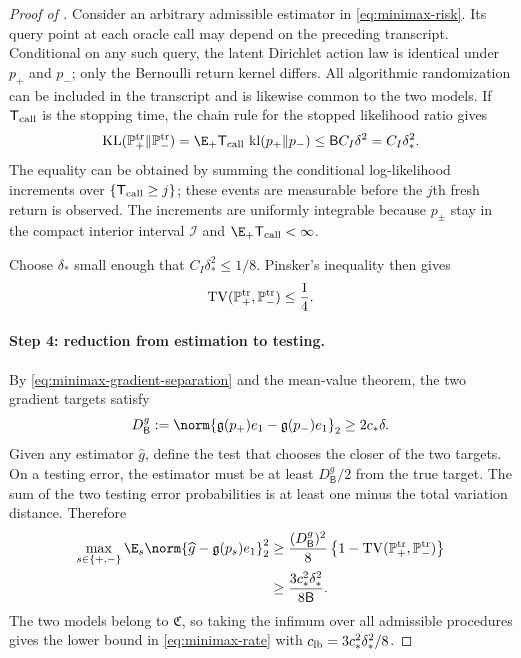 \begin{proof}[Proof of ]
Consider an arbitrary admissible estimator in \eqref{eq:minimax-risk}.  Its query point at each oracle call may depend on the preceding transcript.  Conditional on any such query, the latent Dirichlet action law is identical under $p_+$ and $p_-$; only the Bernoulli return kernel differs.  All algorithmic randomization can be included in the transcript and is likewise common to the two models.  If $\mathsf T_{\rm call}$ is the stopping time, the chain rule for the stopped likelihood ratio gives
\begin{equation}\label{eq:stopped-transcript-kl}
 \operatorname{KL}(\mathbb P_+^{\rm tr}\Vert\mathbb P_-^{\rm tr})
 =\E_+\mathsf T_{\rm call}\,\operatorname{kl}(p_+\Vert p_-)
 \le \mathsf B C_I\delta^2=C_I\delta_*^2.
\end{equation}
The equality can be obtained by summing the conditional log-likelihood increments over
$\{\mathsf T_{\rm call}\ge j\}$; these events are measurable before the $j$th fresh return is observed.  The increments are uniformly integrable because $p_\pm$ stay in the compact interior interval $\mathcal I$ and $\E_+\mathsf T_{\rm call}<\infty$.

Choose $\delta_*$ small enough that $C_I\delta_*^2\le1/8$.  Pinsker's inequality then gives
\begin{equation}\label{eq:minimax-tv}
 \operatorname{TV}(\mathbb P_+^{\rm tr},\mathbb P_-^{\rm tr})\le\frac14.
\end{equation}

\paragraph{Step 4: reduction from estimation to testing.}
By \eqref{eq:minimax-gradient-separation} and the mean-value theorem, the two gradient targets satisfy
\begin{equation}\label{eq:minimax-target-distance}
 D_{\mathsf B}^g
 :=\norm{\mathfrak g(p_+)e_1-\mathfrak g(p_-)e_1}_2
 \ge2c_*\delta.
\end{equation}
Given any estimator $\widehat g$, define the test that chooses the closer of the two targets.  On a testing error, the estimator must be at least $D_{\mathsf B}^g/2$ from the true target.  The sum of the two testing error probabilities is at least one minus the total variation distance.  Therefore
\begin{align*}
 \max_{s\in\{+,-\}}
 \E_s\norm{\widehat g-\mathfrak g(p_s)e_1}_2^2
 &\ge \frac{(D_{\mathsf B}^g)^2}{8}
 \left\{1-\operatorname{TV}(\mathbb P_+^{\rm tr},\mathbb P_-^{\rm tr})\right\}\\
 &\ge \frac{3c_*^2\delta_*^2}{8\mathsf B}.
\end{align*}
The two models belong to $\mathfrak C$, so taking the infimum over all admissible procedures gives the lower bound in \eqref{eq:minimax-rate} with
$c_{\rm lb}=3c_*^2\delta_*^2/8$.


\end{proof}
